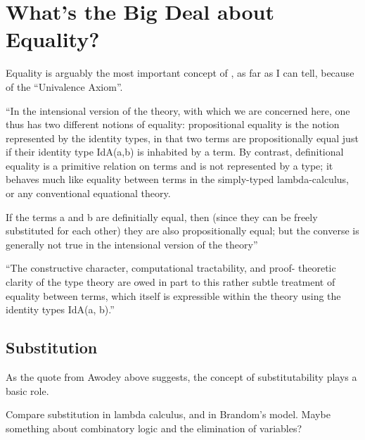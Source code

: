 \section{What's the Big Deal about Equality?}
\label{sect:equality}

\begin{ednote}
  Equality is arguably the most important concept of \HoTT{}, as far
  as I can tell, because of the ``Univalence Axiom''.
\end{ednote}

``In the intensional version of the theory, with which we are
concerned here, one thus has two different notions of equality:
propositional equality is the notion represented by the identity
types, in that two terms are propositionally equal just if their
identity type IdA(a,b) is inhabited by a term. By contrast,
definitional equality is a primitive relation on terms and is not
represented by a type; it behaves much like equality between terms in
the simply-typed lambda-calculus, or any conventional equational
theory.

If the terms a and b are definitially equal, then (since they can be
freely substituted for each other) they are also propositionally
equal; but the converse is generally not true in the intensional
version of the theory''\cite{awodey_tth}

``The constructive character, computational tractability, and proof-
theoretic clarity of the type theory are owed in part to this rather
subtle treatment of equality between terms, which itself is
expressible within the theory using the identity types IdA(a, b).''\cite{awodey_tth}

\subsection{Substitution}
\label{subs:substitution}

As the quote from Awodey above suggests, the concept of
substitutability plays a basic role.

\begin{ednote}
  Compare substitution in lambda calculus, and in Brandom's model.
  Maybe something about combinatory logic and the elimination of
  variables?
\end{ednote}

